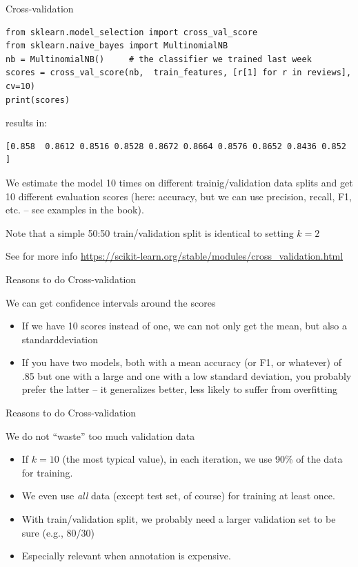 \documentclass[compress]{beamer}
\begin{document}
\begin{frame}[fragile]{Cross-validation}
\begin{lstlisting}
from sklearn.model_selection import cross_val_score
from sklearn.naive_bayes import MultinomialNB
nb = MultinomialNB()     # the classifier we trained last week
scores = cross_val_score(nb,  train_features, [r[1] for r in reviews], cv=10)
print(scores)
\end{lstlisting}

results in:

\begin{lstlisting}
[0.858  0.8612 0.8516 0.8528 0.8672 0.8664 0.8576 0.8652 0.8436 0.852 ]
\end{lstlisting}

We estimate the model 10 times on different trainig/validation data splits and get 10 different evaluation scores (here: accuracy, but we can use precision, recall, F1, etc. -- see examples in the book).

Note that a simple 50:50 train/validation split is identical to setting $k=2$ 

{\tiny See for more info
	\url{https://scikit-learn.org/stable/modules/cross\_validation.html}}
\end{frame}



\begin{frame}{Reasons to do Cross-validation}
	\begin{block}{We can get confidence intervals around the scores}
		\begin{itemize}
			\item If we have 10 scores instead of one, we can not only get the mean, but also a standarddeviation
			\item If you have two models, both with a mean accuracy (or F1, or whatever) of .85 but one with a large and one with a low standard deviation, you probably prefer the latter -- it generalizes better, less likely to suffer from overfitting
		\end{itemize}	
	\end{block}

\end{frame}






\begin{frame}{Reasons to do Cross-validation}
	\begin{block}{We do not ``waste'' too much validation data}
		\begin{itemize}
			\item If $k=10$ (the most typical value), in each iteration, we use 90\% of the data for training.
			\item We even use \emph{all} data (except test set, of course) for training at least once.
			\item With train/validation split, we probably need a larger validation set to be sure (e.g., 80/30)
			\item Especially relevant when annotation is expensive.
		\end{itemize}
	\end{block}
\end{frame}
\end{document}
